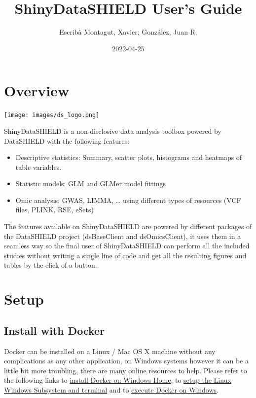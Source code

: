 \documentclass[
]{book}
\title{ShinyDataSHIELD User's Guide}
\author{Escribà Montagut, Xavier; González, Juan R.}
\date{2022-04-25}
\providecommand{\tightlist}{%
  \setlength{\itemsep}{0pt}\setlength{\parskip}{0pt}}
\begin{document}
\maketitle

{
\setcounter{tocdepth}{1}
\tableofcontents
}
\hypertarget{overview}{%
\chapter{Overview}\label{overview}}

\texttt{[image: images/ds\_logo.png]}

ShinyDataSHIELD is a non-disclosive data analysis toolbox powered by DataSHIELD with the following features:

\begin{itemize}
\tightlist
\item
  Descriptive statistics: Summary, scatter plots, histograms and heatmaps of table variables.
\item
  Statistic models: GLM and GLMer model fittings
\item
  Omic analysis: GWAS, LIMMA, \ldots{} using different types of resources (VCF files, PLINK, RSE, eSets)
\end{itemize}

The features available on ShinyDataSHIELD are powered by different packages of the DataSHIELD project (dsBaseClient and dsOmicsClient), it uses them in a seamless way so the final user of ShinyDataSHIELD can perform all the included studies without writing a single line of code and get all the resulting figures and tables by the click of a button.

\hypertarget{setup}{%
\chapter{Setup}\label{setup}}

\hypertarget{install-with-docker}{%
\section{Install with Docker}\label{install-with-docker}}

Docker can be installed on a Linux / Mac OS X machine without any complications as any other application, on Windows systems however it can be a little bit more troubling, there are many online resources to help. Please refer to the following links to \href{https://docs.docker.com/docker-for-windows/install-windows-home/}{install Docker on Windows Home}, to \href{https://blog.nillsf.com/index.php/2020/02/17/setting-up-wsl2-windows-terminal-and-oh-my-zsh/}{setup the Linux Windows Subsystem and terminal} and to \href{https://docs.docker.com/docker-for-windows/wsl/}{execute Docker on Windows}.
\end{document}
